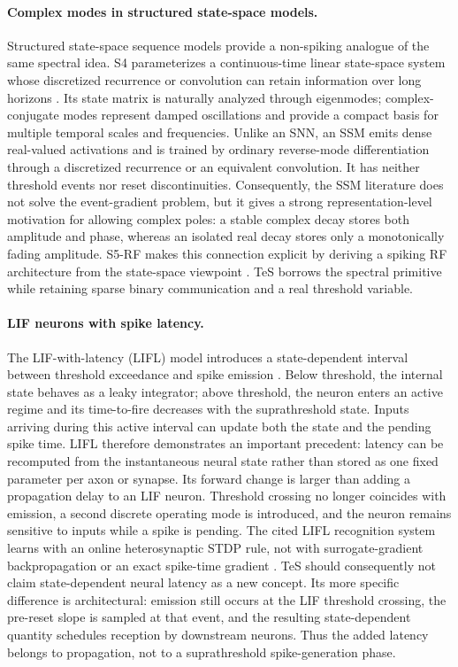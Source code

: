 \paragraph{Complex modes in structured state-space models.}
Structured state-space sequence models provide a non-spiking analogue of the same spectral idea. S4 parameterizes a continuous-time linear state-space system whose discretized recurrence or convolution can retain information over long horizons \cite{gu2022s4}. Its state matrix is naturally analyzed through eigenmodes; complex-conjugate modes represent damped oscillations and provide a compact basis for multiple temporal scales and frequencies. Unlike an SNN, an SSM emits dense real-valued activations and is trained by ordinary reverse-mode differentiation through a discretized recurrence or an equivalent convolution. It has neither threshold events nor reset discontinuities. Consequently, the SSM literature does not solve the event-gradient problem, but it gives a strong representation-level motivation for allowing complex poles: a stable complex decay stores both amplitude and phase, whereas an isolated real decay stores only a monotonically fading amplitude. S5-RF makes this connection explicit by deriving a spiking RF architecture from the state-space viewpoint \cite{huber2025s5rf}. TeS borrows the spectral primitive while retaining sparse binary communication and a real threshold variable.

\paragraph{LIF neurons with spike latency.}
The LIF-with-latency (LIFL) model introduces a state-dependent interval between threshold exceedance and spike emission \cite{susi2018lifl}. Below threshold, the internal state behaves as a leaky integrator; above threshold, the neuron enters an active regime and its time-to-fire decreases with the suprathreshold state. Inputs arriving during this active interval can update both the state and the pending spike time. LIFL therefore demonstrates an important precedent: latency can be recomputed from the instantaneous neural state rather than stored as one fixed parameter per axon or synapse. Its forward change is larger than adding a propagation delay to an LIF neuron. Threshold crossing no longer coincides with emission, a second discrete operating mode is introduced, and the neuron remains sensitive to inputs while a spike is pending. The cited LIFL recognition system learns with an online heterosynaptic STDP rule, not with surrogate-gradient backpropagation or an exact spike-time gradient \cite{susi2018lifl}. TeS should consequently not claim state-dependent neural latency as a new concept. Its more specific difference is architectural: emission still occurs at the LIF threshold crossing, the pre-reset slope is sampled at that event, and the resulting state-dependent quantity schedules reception by downstream neurons. Thus the added latency belongs to propagation, not to a suprathreshold spike-generation phase.


